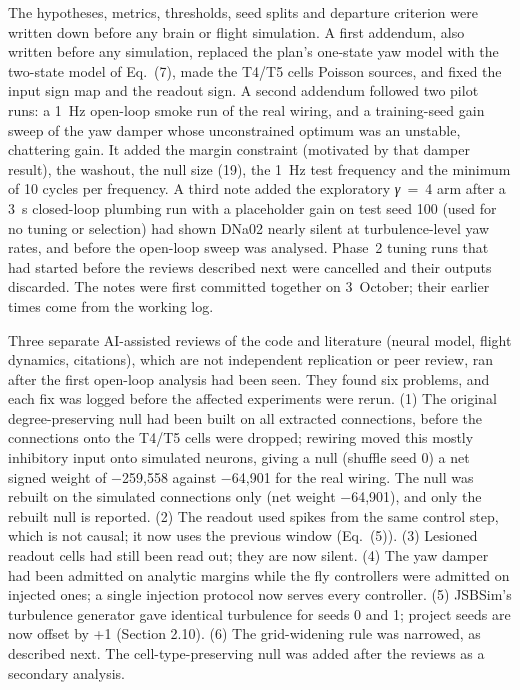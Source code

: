 \documentclass[11pt,letterpaper]{article}
\begin{document}
\noindent The hypotheses, metrics, thresholds, seed splits and departure
criterion were written down before any brain or flight simulation. A
first addendum, also written before any simulation, replaced the plan's
one-state yaw model with the two-state model of Eq.~(7), made the T4/T5
cells Poisson sources, and fixed the input sign map and the readout
sign. A second addendum followed two pilot runs: a 1~Hz open-loop smoke
run of the real wiring, and a training-seed gain sweep of the yaw damper
whose unconstrained optimum was an unstable, chattering gain. It added
the margin constraint (motivated by that damper result), the washout,
the null size (19), the 1~Hz test frequency and the minimum of 10 cycles
per frequency. A third note added the exploratory \emph{γ}~=~4 arm after
a 3~s closed-loop plumbing run with a placeholder gain on test seed 100
(used for no tuning or selection) had shown DNa02 nearly silent at
turbulence-level yaw rates, and before the open-loop sweep was analysed.
Phase~2 tuning runs that had started before the reviews described next
were cancelled and their outputs discarded. The notes were first
committed together on 3~October; their earlier times come from the
working log.

Three separate AI-assisted reviews of the code and literature (neural
model, flight dynamics, citations), which are not independent
replication or peer review, ran after the first open-loop analysis had
been seen. They found six problems, and each fix was logged before the
affected experiments were rerun. (1) The original degree-preserving null
had been built on all extracted connections, before the connections onto
the T4/T5 cells were dropped; rewiring moved this mostly inhibitory
input onto simulated neurons, giving a null (shuffle seed 0) a net
signed weight of −259,558 against −64,901 for the real wiring. The null
was rebuilt on the simulated connections only (net weight −64,901), and
only the rebuilt null is reported. (2) The readout used spikes from the
same control step, which is not causal; it now uses the previous window
(Eq.~(5)). (3) Lesioned readout cells had still been read out; they are
now silent. (4) The yaw damper had been admitted on analytic margins
while the fly controllers were admitted on injected ones; a single
injection protocol now serves every controller. (5) JSBSim's turbulence
generator gave identical turbulence for seeds 0 and 1; project seeds are
now offset by +1 (Section 2.10). (6) The grid-widening rule was
narrowed, as described next. The cell-type-preserving null was added
after the reviews as a secondary analysis.
\end{document}

